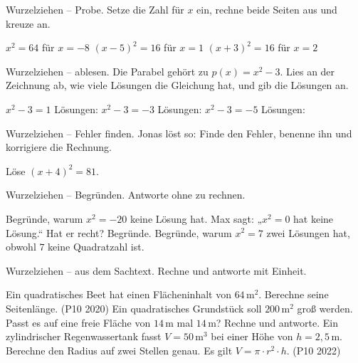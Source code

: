 \begin{aufgabe}{Wurzelziehen -- Probe. Setze die Zahl für $x$ ein, rechne beide Seiten
aus und kreuze an.}
\begin{teile}
\teil $x^2 = 64$ \quad für $x = -8$ \hfill {}
\teil $(x - 5)^2 = 16$ \quad für $x = 1$ \hfill {}
\teil $(x + 3)^2 = 16$ \quad für $x = 2$ \hfill {}
\end{teile}
\end{aufgabe}

\begin{aufgabe}{Wurzelziehen -- ablesen. Die Parabel gehört zu $p(x) = x^2 - 3$. Lies
an der Zeichnung ab, wie viele Lösungen die Gleichung hat, und gib die Lösungen an.}

\begin{ksys}[xmin=-5,xmax=5,ymin=-6,ymax=7,ablesen]
\end{ksys}

\begin{teile}
\teil $x^2 - 3 = 1$ \hfill \leerfeld Lösungen: \leerfeld
\teil $x^2 - 3 = -3$ \hfill \leerfeld Lösungen: \leerfeld
\teil $x^2 - 3 = -5$ \hfill \leerfeld Lösungen: \leerfeld
\end{teile}
\end{aufgabe}

\begin{aufgabe}{Wurzelziehen -- Fehler finden. Jonas löst so:}
Finde den Fehler, benenne ihn und korrigiere die Rechnung.

\begin{teile}
\teil Löse $(x + 4)^2 = 81$.
\end{teile}
\end{aufgabe}

\begin{aufgabe}{Wurzelziehen -- Begründen. Antworte ohne zu rechnen.}
\begin{teile}
\teil Begründe, warum $x^2 = -20$ keine Lösung hat.
\teil Max sagt: „$x^2 = 0$ hat keine Lösung.`` Hat er recht? Begründe.
\teil Begründe, warum $x^2 = 7$ zwei Lösungen hat, obwohl $7$ keine Quadratzahl ist.
\end{teile}
\end{aufgabe}

\begin{aufgabe}{Wurzelziehen -- aus dem Sachtext. Rechne und antworte mit Einheit.}
\begin{teile}
\teil Ein quadratisches Beet hat einen Flächeninhalt von $64\,\text{m}^2$. Berechne
seine Seitenlänge. \hfill (P10 2020)
\teil Ein quadratisches Grundstück soll $200\,\text{m}^2$ groß werden. Passt es auf
eine freie Fläche von $14\,\text{m}$ mal $14\,\text{m}$? Rechne und antworte.
\teil Ein zylindrischer Regenwassertank fasst $V = 50\,\text{m}^3$ bei einer Höhe von
$h = 2{,}5\,\text{m}$. Berechne den Radius auf zwei Stellen genau. Es gilt
$V = \pi \cdot r^2 \cdot h$. \hfill (P10 2022)
\end{teile}
\end{aufgabe}

